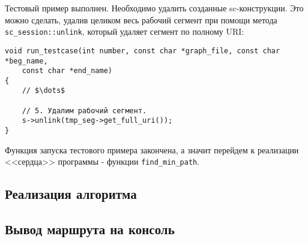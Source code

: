 Тестовый пример выполнен. Необходимо удалить созданные
sc-конструкции. Это можно сделать, удалив целиком весь рабочий сегмент
при помощи метода \lstinline|sc_session::unlink|, который удаляет
сегмент по полному URI:
\begin{lstlisting}[texcl]
void run_testcase(int number, const char *graph_file, const char *beg_name,
    const char *end_name)
{
    // $\dots$

    // 5. Удалим рабочий сегмент.
    s->unlink(tmp_seg->get_full_uri());
}
\end{lstlisting}

Функция запуска тестового примера закончена, а значит перейдем к
реализации <<сердца>> программы - функции \lstinline|find_min_path|.

\subsection{Реализация алгоритма}
\label{sec:libscprg_find_min_path}



\subsection{Вывод маршрута на консоль}
\label{sec:libscprg_print_route}




